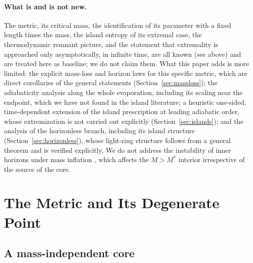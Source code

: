 \documentclass[11pt]{article}
\begin{document}
\paragraph{What is and is not new.}
The metric, its critical mass, the identification of its parameter with a fixed length times the mass, the island entropy of its extremal case, the thermodynamic remnant picture, and the statement that extremality is approached only asymptotically, in infinite time, are all known (see above) and are treated here as baseline; we do not claim them. What this paper adds is more limited: the explicit mass-loss and horizon laws for this specific metric, which are direct corollaries of the general statements (Section~\ref{sec:massloss}); the adiabaticity analysis along the whole evaporation, including its scaling near the endpoint, which we have not found in the island literature; a heuristic one-sided, time-dependent extension of the island prescription at leading adiabatic order, whose extremization is not carried out explicitly (Section~\ref{sec:islands}); and the analysis of the horizonless branch, including its island structure (Section~\ref{sec:horizonless}), whose light-ring structure follows from a general theorem and is verified explicitly. We do not address the instability of inner horizons under mass inflation \citep{PoissonIsrael1990,CarballoRubio2021,Bonanno2021}, which affects the $M>M^*$ interior irrespective of the source of the core.

\section{The Metric and Its Degenerate Point}
\label{sec:metric}

\subsection{A mass-independent core}
\end{document}
